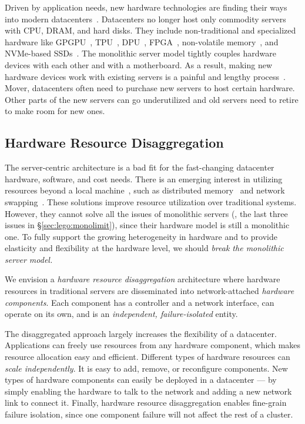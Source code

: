 Driven by application needs, new hardware technologies are finding their ways into modern datacenters~\cite{sigarch-dc}.
Datacenters no longer host only commodity servers with CPU, DRAM, and hard disks. 
They include non-traditional and specialized hardware like GPGPU~\cite{GPU-google,GPU-aws}, 
TPU~\cite{TPU}, 
DPU~\cite{DPU},
FPGA~\cite{Putnam14-FPGA,Amazon-F1}, %
non-volatile memory~\cite{Intel3DXpoint}, %
and NVMe-based SSDs~\cite{everspin}.
The monolithic server model tightly couples hardware devices with each other and with a motherboard.
As a result, making new hardware devices work with existing servers is a painful and lengthy process~\cite{Putnam14-FPGA}.
Mover, datacenters often need to purchase new servers to host certain hardware.
Other parts of the new servers can go underutilized 
and old servers need to retire to make room for new ones.

\subsection{Hardware Resource Disaggregation}
The server-centric architecture is a bad fit for the fast-changing datacenter hardware, software, and cost needs.
There is an emerging interest in utilizing resources beyond a local machine~\cite{Gao16-OSDI},
such as distributed memory~\cite{Dragojevic14-FaRM,Nelson15-ATC,Aguilera17-SOCC,Novakovic16-SOCC} and network swapping~\cite{GU17-NSDI}. 
These solutions improve resource utilization over traditional systems.
However, they cannot solve all the issues of monolithic servers (\eg, the last three issues in \S\ref{sec:lego:monolimit}), 
since their hardware model is still a monolithic one.
To fully support the growing heterogeneity in hardware and to provide elasticity and flexibility at the hardware level, 
we should {\em break the monolithic server model.}%

We envision a {\em hardware resource disaggregation} architecture 
where hardware resources in traditional servers are disseminated into network-attached {\em hardware components}.
Each component has a controller and a network interface,
can operate on its own,
and is an {\em independent, failure-isolated} entity.

The disaggregated approach largely increases the flexibility of a datacenter.
Applications can freely use resources from any hardware component,
which makes resource allocation easy and efficient.
Different types of hardware resources can {\em scale independently}.
It is easy to add, remove, or reconfigure components.
New types of hardware components can easily be deployed in a datacenter ---
by simply enabling the hardware to talk to the network and adding a new network link to connect it.
Finally, hardware resource disaggregation enables fine-grain failure isolation, %
since one component failure will not affect the rest of a cluster.

